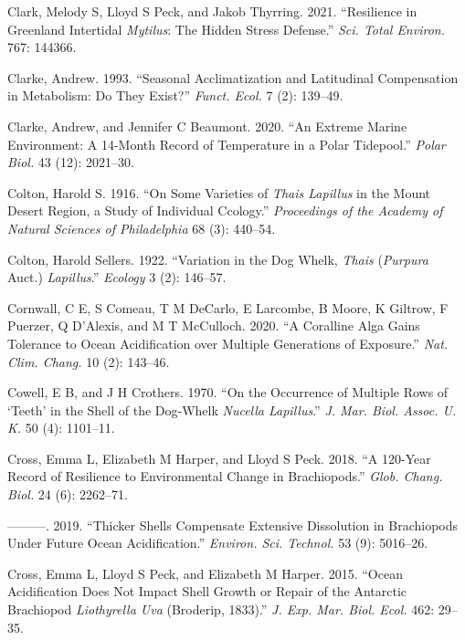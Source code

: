 \documentclass[smallextended]{svjour3}       %
\newlength{\cslhangindent}
\newenvironment{CSLReferences}[2] %
 {%
  \setlength{\parindent}{0pt}
  \ifodd #1 \everypar{\setlength{\hangindent}{\cslhangindent}}\ignorespaces\fi
  \ifnum #2 > 0
  \setlength{\parskip}{#2\baselineskip}
  \fi
 }%
 {}
\begin{document}
\begin{CSLReferences}{1}{0}
\leavevmode{}%
Clark, Melody S, Lloyd S Peck, and Jakob Thyrring. 2021. {``Resilience
in Greenland Intertidal \emph{Mytilus}: The Hidden Stress Defense.''}
\emph{Sci. Total Environ.} 767: 144366.

\leavevmode{}%
Clarke, Andrew. 1993. {``Seasonal Acclimatization and Latitudinal
Compensation in Metabolism: Do They Exist?''} \emph{Funct. Ecol.} 7 (2):
139--49.

\leavevmode{}%
Clarke, Andrew, and Jennifer C Beaumont. 2020. {``An Extreme Marine
Environment: A 14-Month Record of Temperature in a Polar Tidepool.''}
\emph{Polar Biol.} 43 (12): 2021--30.

\leavevmode{}%
Colton, Harold S. 1916. {``On Some Varieties of \emph{Thais Lapillus} in
the Mount Desert Region, a Study of Individual Ccology.''}
\emph{Proceedings of the Academy of Natural Sciences of Philadelphia} 68
(3): 440--54.

\leavevmode{}%
Colton, Harold Sellers. 1922. {``Variation in the Dog Whelk,
\emph{Thais} (\emph{Purpura} Auct.) \emph{Lapillus}.''} \emph{Ecology} 3
(2): 146--57.

\leavevmode{}%
Cornwall, C E, S Comeau, T M DeCarlo, E Larcombe, B Moore, K Giltrow, F
Puerzer, Q D'Alexis, and M T McCulloch. 2020. {``A Coralline Alga Gains
Tolerance to Ocean Acidification over Multiple Generations of
Exposure.''} \emph{Nat. Clim. Chang.} 10 (2): 143--46.

\leavevmode{}%
Cowell, E B, and J H Crothers. 1970. {``On the Occurrence of Multiple
Rows of {`Teeth'} in the Shell of the Dog-Whelk \emph{Nucella
Lapillus}.''} \emph{J. Mar. Biol. Assoc. U. K.} 50 (4): 1101--11.

\leavevmode{}%
Cross, Emma L, Elizabeth M Harper, and Lloyd S Peck. 2018. {``A 120-Year
Record of Resilience to Environmental Change in Brachiopods.''}
\emph{Glob. Chang. Biol.} 24 (6): 2262--71.

\leavevmode{}%
---------. 2019. {``Thicker Shells Compensate Extensive Dissolution in
Brachiopods Under Future Ocean Acidification.''} \emph{Environ. Sci.
Technol.} 53 (9): 5016--26.

\leavevmode{}%
Cross, Emma L, Lloyd S Peck, and Elizabeth M Harper. 2015. {``Ocean
Acidification Does Not Impact Shell Growth or Repair of the Antarctic
Brachiopod \emph{Liothyrella Uva} (Broderip, 1833).''} \emph{J. Exp.
Mar. Biol. Ecol.} 462: 29--35.


\end{CSLReferences}
\end{document}
